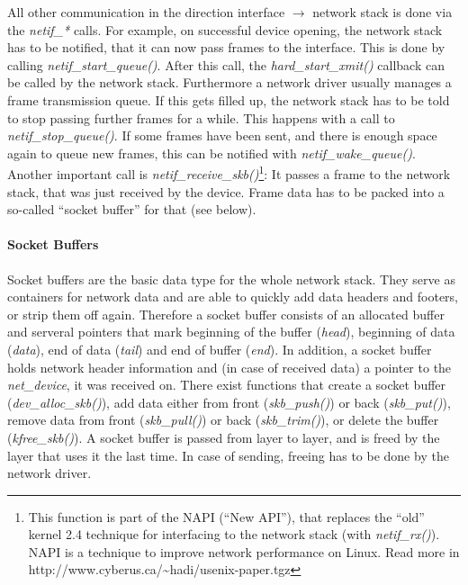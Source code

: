 \documentclass[a4paper,12pt,BCOR6mm,bibtotoc,idxtotoc]{scrbook}
\begin{document}
All other communication in the direction interface $\to$ network stack
is done via the \textit{netif\_*} calls. For example, on successful
device opening, the network stack has to be notified, that it can now
pass frames to the interface. This is done by calling
\textit{netif\_start\_queue()}. After this call, the
\textit{hard\_start\_xmit()} callback can be called by the network
stack. Furthermore a network driver usually manages a frame
transmission queue. If this gets filled up, the network stack has to
be told to stop passing further frames for a while. This happens with
a call to \textit{netif\_stop\_queue()}. If some frames have been
sent, and there is enough space again to queue new frames, this can be
notified with \textit{netif\_wake\_queue()}. Another important call is
\textit{netif\_receive\_skb()}\footnote{This function is part of the
  NAPI (``New API''), that replaces the ``old'' kernel 2.4 technique
  for interfacing to the network stack (with \textit{netif\_rx()}).
  NAPI is a technique to improve network performance on Linux. Read
  more in
  http://www.cyberus.ca/\textasciitilde{}hadi/usenix-paper.tgz}: It
passes a frame to the network stack, that was just received by the
device.  Frame data has to be packed into a so-called ``socket
buffer'' for that (see below).

\paragraph{Socket Buffers}

Socket buffers are the basic data type for the whole network stack.
They serve as containers for network data and are able to quickly add
data headers and footers, or strip them off again. Therefore a socket
buffer consists of an allocated buffer and serveral pointers that mark
beginning of the buffer (\textit{head}), beginning of data
(\textit{data}), end of data (\textit{tail}) and end of buffer
(\textit{end}). In addition, a socket buffer holds network header
information and (in case of received data) a pointer to the
\textit{net\_device}, it was received on. There exist functions that
create a socket buffer (\textit{dev\_alloc\_skb()}), add data either
from front (\textit{skb\_push()}) or back (\textit{skb\_put()}),
remove data from front (\textit{skb\_pull()}) or back
(\textit{skb\_trim()}), or delete the buffer (\textit{kfree\_skb()}).
A socket buffer is passed from layer to layer, and is freed by the
layer that uses it the last time. In case of sending, freeing has to
be done by the network driver.
\end{document}
